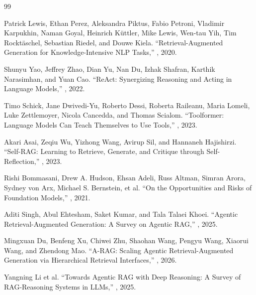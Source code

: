 \begin{thebibliography}{99}
 
Patrick Lewis, Ethan Perez, Aleksandra Piktus, Fabio Petroni, Vladimir Karpukhin,
Naman Goyal, Heinrich K\"{u}ttler, Mike Lewis, Wen-tau Yih, Tim Rockt\"{a}schel,
Sebastian Riedel, and Douwe Kiela.
\newblock ``Retrieval-Augmented Generation for Knowledge-Intensive NLP Tasks,''
, 2020.
 
Shunyu Yao, Jeffrey Zhao, Dian Yu, Nan Du, Izhak Shafran, Karthik Narasimhan,
and Yuan Cao.
\newblock ``ReAct: Synergizing Reasoning and Acting in Language Models,''
, 2022.
 
Timo Schick, Jane Dwivedi-Yu, Roberto Dessi, Roberta Raileanu, Maria Lomeli,
Luke Zettlemoyer, Nicola Cancedda, and Thomas Scialom.
\newblock ``Toolformer: Language Models Can Teach Themselves to Use Tools,''
, 2023.
 
Akari Asai, Zeqiu Wu, Yizhong Wang, Avirup Sil, and Hannaneh Hajishirzi.
\newblock ``Self-RAG: Learning to Retrieve, Generate, and Critique through
Self-Reflection,''
, 2023.
 
Rishi Bommasani, Drew A. Hudson, Ehsan Adeli, Russ Altman, Simran Arora,
Sydney von Arx, Michael S. Bernstein, et al.
\newblock ``On the Opportunities and Risks of Foundation Models,''
, 2021.
 
Aditi Singh, Abul Ehtesham, Saket Kumar, and Tala Talaei Khoei.
\newblock ``Agentic Retrieval-Augmented Generation: A Survey on Agentic RAG,''
, 2025.
 
Mingxuan Du, Benfeng Xu, Chiwei Zhu, Shaohan Wang, Pengyu Wang, Xiaorui Wang,
and Zhendong Mao.
\newblock ``A-RAG: Scaling Agentic Retrieval-Augmented Generation via Hierarchical
Retrieval Interfaces,''
, 2026.
 
Yangning Li et al.
\newblock ``Towards Agentic RAG with Deep Reasoning: A Survey of RAG-Reasoning
Systems in LLMs,''
, 2025.
 

\end{thebibliography}
